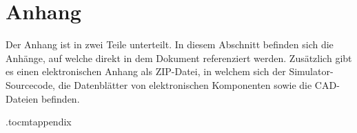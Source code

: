 \documentclass[../main.tex]{subfiles}
\begin{document}
\newpage
\appendix
\chapter*{Anhang}

Der Anhang ist in zwei Teile unterteilt.
In diesem Abschnitt befinden sich die Anhänge, auf welche direkt in dem Dokument referenziert werden.
Zusätzlich gibt es einen elektronischen Anhang als ZIP-Datei, in welchem sich der Simulator-Sourcecode, die Datenblätter von elektronischen Komponenten sowie die CAD-Dateien befinden.

\renewcommand{\thesection}{A\arabic{section}}
\etocdepthtag.toc{mtappendix}
\addtableofcontents






% 
\end{document}
